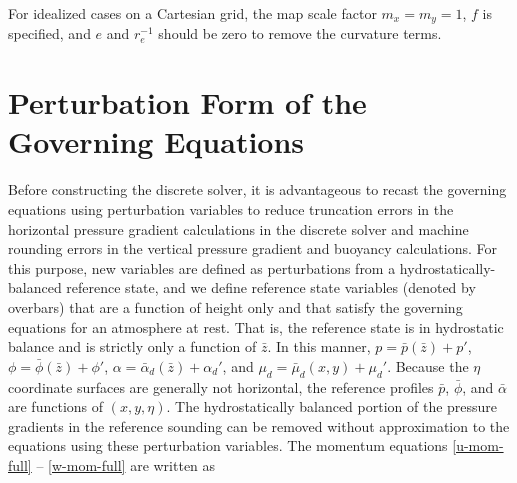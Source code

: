 For idealized cases on a Cartesian grid, the map scale factor $m_x = m_y = 1$, 
$f$ is specified, and $e$ and $r_e^{-1}$ should be zero to remove the curvature terms.

\section{Perturbation Form of the Governing Equations}

Before constructing the discrete solver, it is advantageous to recast
the governing equations using perturbation variables to reduce
truncation errors in the horizontal pressure gradient calculations in
the discrete solver and machine rounding errors in
the vertical pressure gradient and buoyancy calculations.  
For this purpose, new
variables are defined as perturbations from a hydrostatically-balanced 
reference state, and we define reference state
variables (denoted by overbars) that are a function of height only and
that satisfy the governing equations for an atmosphere at rest.  That is,
the reference state is in hydrostatic balance and is strictly only a
function of $\bar z$.  In this manner, $p=\bar p(\bar z)+p'$, $\phi=\bar
\phi(\bar z)
+\phi'$, $\alpha=\bar \alpha_d(\bar z) +\alpha_d'$, and $\mu_d = \bar\mu_d(x,y) +
\mu_d'$. Because the $\eta$ coordinate surfaces are generally not
horizontal, the reference profiles $\bar p$, $\bar\phi$, and
$\bar\alpha$ are functions of $(x,y,\eta)$. 
The hydrostatically balanced portion of the pressure gradients in the
reference sounding can be removed without approximation to the equations
using these perturbation variables.
The momentum equations 
\eqref{u-mom-full} -- \eqref{w-mom-full} are written as
%
